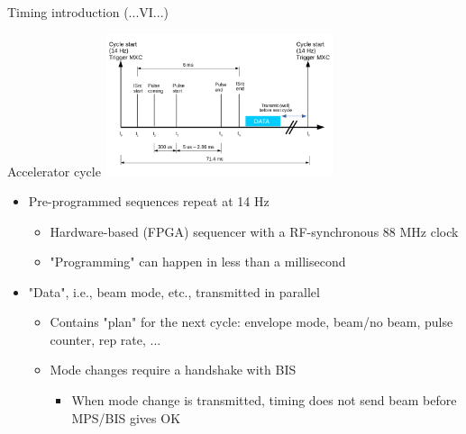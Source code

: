 \documentclass[
  9pt
  , table
  , ignorenonframetext
]{beamer}
\begin{document}
\begin{frame}{Timing introduction (...VI...)}
  \begin{block}{Accelerator cycle}
    \centering
    \includegraphics[width=0.5\textwidth]{./pictures/AccCycle.png}
    \begin{itemize}
      \item Pre-programmed sequences repeat at 14 Hz
      \begin{itemize}
        \item Hardware-based (FPGA) sequencer with a RF-synchronous 88 MHz clock
        \item "Programming" can happen in less than a millisecond
      \end{itemize}
      \item "Data", i.e., beam mode, etc., transmitted in parallel
      \begin{itemize}
        \item Contains "plan" for the next cycle: envelope mode, beam/no beam, pulse counter, rep rate, ...
        \item Mode changes require a handshake with BIS
        \begin{itemize}
          \item When mode change is transmitted, timing does not send beam before MPS/BIS gives OK
        \end{itemize}
      \end{itemize}
    \end{itemize}
  \end{block}
\end{frame}
\end{document}
